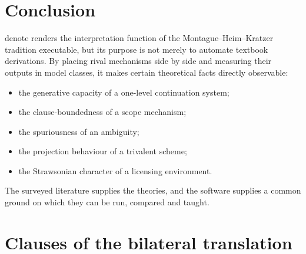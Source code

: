 \documentclass[11pt,a4paper]{article}
\newcommand{\dn}{\textsf{denote}}
\theoremstyle{definition}
\begin{document}
\section{Conclusion}\label{sec:conclusion}
\dn{} renders the interpretation function of the Montague--Heim--Kratzer tradition executable, but its purpose is not merely to automate textbook derivations. By placing rival mechanisms side by side and measuring their outputs in model classes, it makes certain theoretical facts directly observable:
\begin{itemize}
\item the generative capacity of a one-level continuation system;
\item the clause-boundedness of a scope mechanism;
\item the spuriousness of an ambiguity;
\item the projection behaviour of a trivalent scheme;
\item the Strawsonian character of a licensing environment.
\end{itemize}
The surveyed literature supplies the theories, and the software supplies a common ground on which they can be run, compared and taught.




\appendix
\section{Clauses of the bilateral translation}\label{app:clauses}
\end{document}
